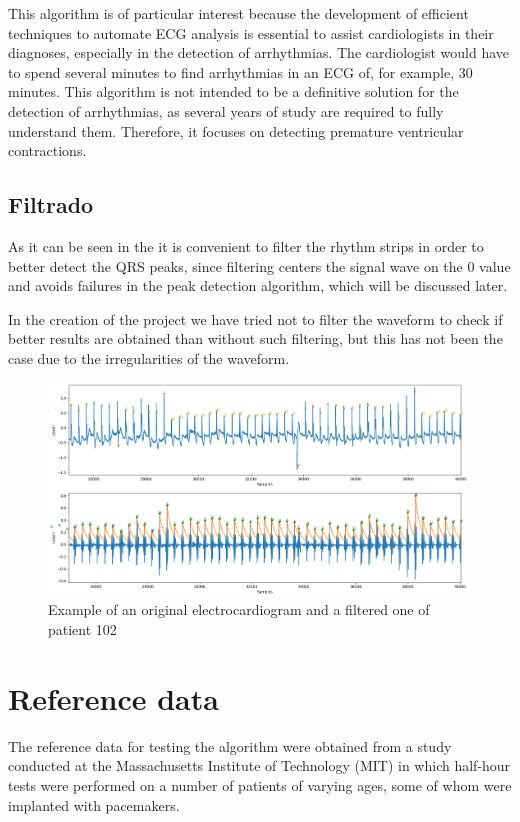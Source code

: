 This algorithm is of particular interest\cite{kiranyaz2011personalized} because the development of efficient techniques to automate ECG analysis is essential to assist cardiologists in their diagnoses, especially in the detection of arrhythmias. The cardiologist would have to spend several minutes to find arrhythmias in an ECG of, for example, 30 minutes. This algorithm is not intended to be a definitive solution for the detection of arrhythmias, as several years of study are required to fully understand them. Therefore, it focuses on detecting premature ventricular contractions.

\subsection*{Filtrado}
As it can be seen in the  it is convenient to filter the rhythm strips in order to better detect the QRS peaks, since filtering centers the signal wave on the 0 value and avoids failures in the peak detection algorithm, which will be discussed later. 

In the creation of the project we have tried not to filter the waveform to check if better results are obtained than without such filtering, but this has not been the case due to the irregularities of the waveform.

\begin{figure}[h!]
	\centering
	\includegraphics[width=0.99\textwidth]{./Images/img_introduccion/102filtrado_y_sin_filtrar.png}
	\caption{Example of an original electrocardiogram and a filtered one of patient 102}
	\label{fig:102filtradoysinfiltrar}
\end{figure}

\section*{Reference data}
The reference data for testing the algorithm were obtained from a study conducted at the Massachusetts Institute of Technology (MIT)\cite{MIT} in which half-hour tests were performed on a number of patients of varying ages, some of whom were implanted with pacemakers.

